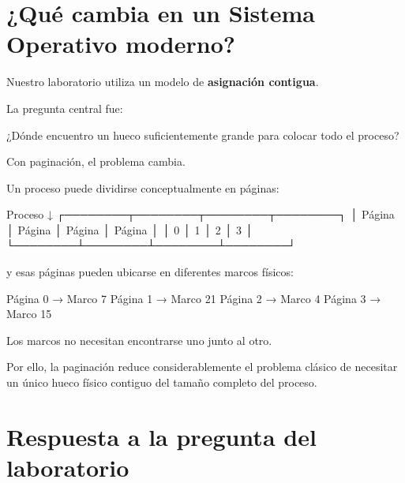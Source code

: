 \documentclass[
  spanish,
  letterpaper,
]{scrbook}
\newenvironment{Shaded}{\begin{snugshade}}{\end{snugshade}}
\newcommand{\NormalTok}[1]{\textcolor[rgb]{0.00,0.23,0.31}{#1}}
\begin{document}

\chapter{¿Qué cambia en un Sistema Operativo
moderno?}\label{quuxe9-cambia-en-un-sistema-operativo-moderno}

Nuestro laboratorio utiliza un modelo de \textbf{asignación contigua}.

La pregunta central fue:

\begin{Shaded}
\begin{Highlighting}[]
\NormalTok{¿Dónde encuentro un hueco suficientemente grande}
\NormalTok{para colocar todo el proceso?}
\end{Highlighting}
\end{Shaded}

Con paginación, el problema cambia.

Un proceso puede dividirse conceptualmente en páginas:

\begin{Shaded}
\begin{Highlighting}[]
\NormalTok{Proceso}
\NormalTok{  ↓}
\NormalTok{┌────────┬────────┬────────┬────────┐}
\NormalTok{│ Página │ Página │ Página │ Página │}
\NormalTok{│   0    │   1    │   2    │   3    │}
\NormalTok{└────────┴────────┴────────┴────────┘}
\end{Highlighting}
\end{Shaded}

y esas páginas pueden ubicarse en diferentes marcos físicos:

\begin{Shaded}
\begin{Highlighting}[]
\NormalTok{Página 0 → Marco 7}
\NormalTok{Página 1 → Marco 21}
\NormalTok{Página 2 → Marco 4}
\NormalTok{Página 3 → Marco 15}
\end{Highlighting}
\end{Shaded}

Los marcos no necesitan encontrarse uno junto al otro.

Por ello, la paginación reduce considerablemente el problema clásico de
necesitar un único hueco físico contiguo del tamaño completo del
proceso.


\chapter{Respuesta a la pregunta del
laboratorio}\label{respuesta-a-la-pregunta-del-laboratorio}
\end{document}
